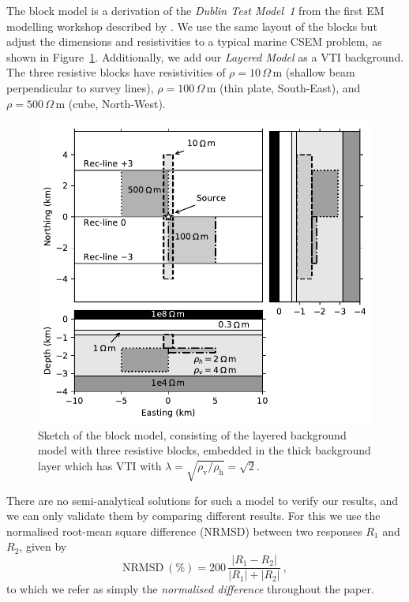\documentclass[extra, camera,%
]{gji}
\newcommand{\mr}[1]{\mathrm{#1}}
\newcommand{\ohmm}{\ensuremath{\Omega\,}\text{m}\xspace}
\begin{document}
The block model is a derivation of the \emph{Dublin Test Model~1} from the first EM modelling workshop described by \cite{GJI.13.Miensopust}. We use the same layout of the blocks but adjust the dimensions and resistivities to a typical marine CSEM problem, as shown in Figure~\ref{fig:model-block}. Additionally, we add our \emph{Layered Model} as a VTI background. The three resistive blocks have resistivities of $\rho=10\,\ohmm$ (shallow beam perpendicular to survey lines), $\rho=100\,\ohmm$ (thin plate, South-East), and $\rho=500\,\ohmm$ (cube, North-West).
%
\begin{figure}
  \centering
  \includegraphics[width=\linewidth]{figures/model-block}
  \caption{Sketch of the block model, consisting of the layered background model with three resistive blocks, embedded in the thick background layer which has VTI with $\lambda=\sqrt{\rho_\textrm{v}/\rho_\textrm{h}}=\sqrt{2}$.}
  \label{fig:model-block}
\end{figure}
%

There are no semi-analytical solutions for such a model to verify our results, and we can only validate them by comparing different results. For this we use the normalised root-mean square difference (NRMSD) between two responses $R_1$ and $R_2$, given by
%
\begin{equation}
  \mr{NRMSD~(\%)} = 200\,\frac{|R_1 - R_2|}{|R_1| + |R_2|}\ ,
  \label{eq:nrmsd}
\end{equation}
%
to which we refer as simply the \emph{normalised difference} throughout the paper.
\end{document}
